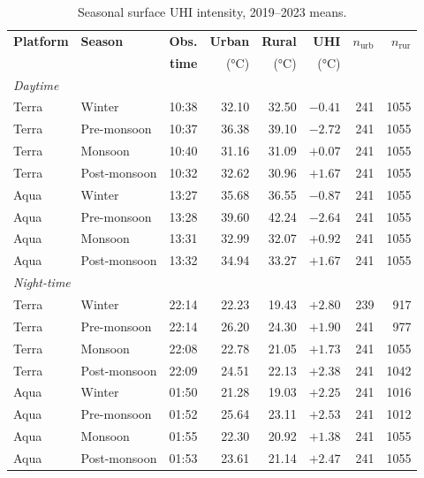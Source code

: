 \documentclass[11pt,a4paper]{article}
\begin{document}
\begin{table}[htbp]
\centering
\small
\begin{tabular}{llrrrrrr}
\toprule
\textbf{Platform} & \textbf{Season} & \textbf{Obs.} &
\textbf{Urban} & \textbf{Rural} & \textbf{UHI} &
$n_{\mathrm{urb}}$ & $n_{\mathrm{rur}}$ \\
 & & \textbf{time} & (\si{\degreeCelsius}) & (\si{\degreeCelsius}) &
(\si{\degreeCelsius}) & & \\
\midrule
\multicolumn{8}{l}{\textit{Daytime}} \\
Terra & Winter       & 10:38 & 32.10 & 32.50 & $-0.41$ & 241 & 1055 \\
Terra & Pre-monsoon  & 10:37 & 36.38 & 39.10 & $-2.72$ & 241 & 1055 \\
Terra & Monsoon      & 10:40 & 31.16 & 31.09 & $+0.07$ & 241 & 1055 \\
Terra & Post-monsoon & 10:32 & 32.62 & 30.96 & $+1.67$ & 241 & 1055 \\
Aqua  & Winter       & 13:27 & 35.68 & 36.55 & $-0.87$ & 241 & 1055 \\
Aqua  & Pre-monsoon  & 13:28 & 39.60 & 42.24 & $-2.64$ & 241 & 1055 \\
Aqua  & Monsoon      & 13:31 & 32.99 & 32.07 & $+0.92$ & 241 & 1055 \\
Aqua  & Post-monsoon & 13:32 & 34.94 & 33.27 & $+1.67$ & 241 & 1055 \\
\midrule
\multicolumn{8}{l}{\textit{Night-time}} \\
Terra & Winter       & 22:14 & 22.23 & 19.43 & $+2.80$ & 239 &  917 \\
Terra & Pre-monsoon  & 22:14 & 26.20 & 24.30 & $+1.90$ & 241 &  977 \\
Terra & Monsoon      & 22:08 & 22.78 & 21.05 & $+1.73$ & 241 & 1055 \\
Terra & Post-monsoon & 22:09 & 24.51 & 22.13 & $+2.38$ & 241 & 1042 \\
Aqua  & Winter       & 01:50 & 21.28 & 19.03 & $+2.25$ & 241 & 1016 \\
Aqua  & Pre-monsoon  & 01:52 & 25.64 & 23.11 & $+2.53$ & 241 & 1012 \\
Aqua  & Monsoon      & 01:55 & 22.30 & 20.92 & $+1.38$ & 241 & 1055 \\
Aqua  & Post-monsoon & 01:53 & 23.61 & 21.14 & $+2.47$ & 241 & 1055 \\
\bottomrule
\end{tabular}
\caption{Seasonal surface UHI intensity, 2019--2023 means.}
\label{tab:headline}
\end{table}
\end{document}
